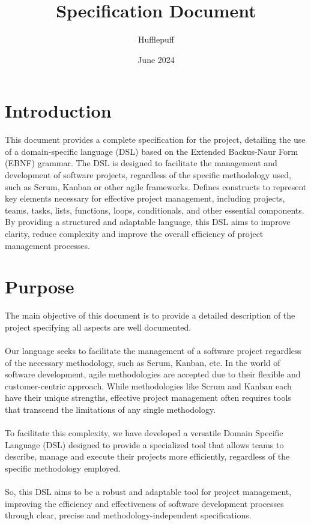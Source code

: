 \documentclass{article}
\title{Specification Document}
\author{Hufflepuff}
\date{June 2024}
\begin{document}
\maketitle

\tableofcontents
\newpage

\section{Introduction}
\label{sec:introduction}
This document provides a complete specification for the project, detailing the use of a domain-specific language (DSL) based on the Extended Backus-Naur Form (EBNF) grammar. The DSL is designed to facilitate the management and development of software projects, regardless of the specific methodology used, such as Scrum, Kanban or other agile frameworks. Defines constructs to represent key elements necessary for effective project management, including projects, teams, tasks, lists, functions, loops, conditionals, and other essential components. By providing a structured and adaptable language, this DSL aims to improve clarity, reduce complexity and improve the overall efficiency of project management processes.

\section{Purpose}
\label{sec:purpose}
The main objective of this document is to provide a detailed description of the project specifying all aspects are well documented.
\\\\
Our language seeks to facilitate the management of a software project regardless of the necessary methodology, such as Scrum, Kanban, etc. In the world of software development, agile methodologies are accepted due to their flexible and customer-centric approach. While methodologies like Scrum and Kanban each have their unique strengths, effective project management often requires tools that transcend the limitations of any single methodology.
\\\\
To facilitate this complexity, we have developed a versatile Domain Specific Language (DSL) designed to provide a specialized tool that allows teams to describe, manage and execute their projects more efficiently, regardless of the specific methodology employed. 
\\\\
So, this DSL aims to be a robust and adaptable tool for project management, improving the efficiency and effectiveness of software development processes through clear, precise and methodology-independent specifications.
\end{document}
